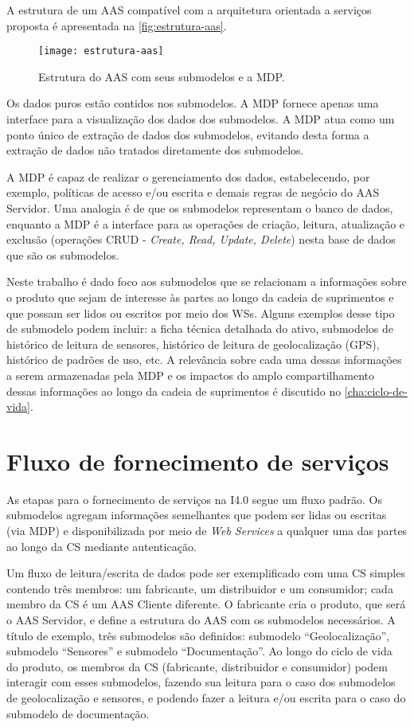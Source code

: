 A estrutura de um AAS compatível com a arquitetura orientada a serviços proposta é apresentada na \autoref{fig:estrutura-aas}.

\begin{figure}[htb]
	\centering
	\texttt{[image: estrutura-aas]}
	\caption{Estrutura do AAS com seus submodelos e a MDP.}
	\label{fig:estrutura-aas}
\end{figure}

Os dados puros estão contidos nos submodelos. A MDP fornece apenas uma interface para a visualização dos dados dos submodelos. A MDP atua como um ponto único de extração de dados dos submodelos, evitando desta forma a extração de dados não tratados diretamente dos submodelos.

A MDP é capaz de realizar o gerenciamento dos dados, estabelecendo, por exemplo, políticas de acesso e/ou escrita e demais regras de negócio do AAS Servidor. Uma analogia é de que os submodelos representam o banco de dados, enquanto a MDP é a interface para as operações de criação, leitura, atualização e exclusão (operações CRUD - \textit{Create, Read, Update, Delete}) nesta base de dados que são os submodelos.

Neste trabalho é dado foco aos submodelos que se relacionam a informações sobre o produto que sejam de interesse às partes ao longo da cadeia de suprimentos e que possam ser lidos ou escritos por meio dos WSs. Alguns exemplos desse tipo de submodelo podem incluir: a ficha técnica detalhada do ativo, submodelos de histórico de leitura de sensores, histórico de leitura de geolocalização (GPS), histórico de padrões de uso, etc. A relevância sobre cada uma dessas informações a serem armazenadas pela MDP e os impactos do amplo compartilhamento dessas informações ao longo da cadeia de suprimentos é discutido no \autoref{cha:ciclo-de-vida}.

\section{Fluxo de fornecimento de serviços}

As etapas para o fornecimento de serviços na I4.0 segue um fluxo padrão. Os submodelos agregam informações semelhantes que podem ser lidas ou escritas (via MDP) e disponibilizada por meio de \textit{Web Services} a qualquer uma das partes ao longo da CS mediante autenticação.

Um fluxo de leitura/escrita de dados pode ser exemplificado com uma CS simples contendo três membros: um fabricante, um distribuidor e um consumidor; cada membro da CS é um AAS Cliente diferente. O fabricante cria o produto, que será o AAS Servidor, e define a estrutura do AAS com os submodelos necessários. A título de exemplo, três submodelos são definidos: submodelo ``Geolocalização'', submodelo ``Sensores'' e submodelo ``Documentação''. Ao longo do ciclo de vida do produto, os membros da CS (fabricante, distribuidor e consumidor) podem interagir com esses submodelos, fazendo sua leitura para o caso dos submodelos de geolocalização e sensores, e podendo fazer a leitura e/ou escrita para o caso do submodelo de documentação.

